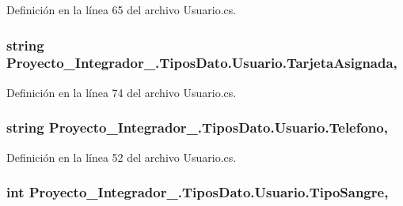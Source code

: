 Definición en la línea 65 del archivo Usuario.\-cs.

\hypertarget{class_proyecto___integrador__3_1_1_tipos_dato_1_1_usuario_a4ecaaf4c0f0b8e78d71fcab8c7da253a}{
\subsubsection[{Tarjeta\-Asignada}]{\setlength{\rightskip}{0pt plus 5cm}string Proyecto\-\_\-\-Integrador\-\_.\-Tipos\-Dato.\-Usuario.\-Tarjeta\-Asignada\hspace{0.3cm}{\ttfamily [get]}, {\ttfamily [set]}}}\label{class_proyecto___integrador__3_1_1_tipos_dato_1_1_usuario_a4ecaaf4c0f0b8e78d71fcab8c7da253a}


Definición en la línea 74 del archivo Usuario.\-cs.

\hypertarget{class_proyecto___integrador__3_1_1_tipos_dato_1_1_usuario_a576131d83803eab74ec85992416f1220}{
\subsubsection[{Telefono}]{\setlength{\rightskip}{0pt plus 5cm}string Proyecto\-\_\-\-Integrador\-\_.\-Tipos\-Dato.\-Usuario.\-Telefono\hspace{0.3cm}{\ttfamily [get]}, {\ttfamily [set]}}}\label{class_proyecto___integrador__3_1_1_tipos_dato_1_1_usuario_a576131d83803eab74ec85992416f1220}


Definición en la línea 52 del archivo Usuario.\-cs.

\hypertarget{class_proyecto___integrador__3_1_1_tipos_dato_1_1_usuario_a03896a1cdb77ff1166088f707b65896c}{
\subsubsection[{Tipo\-Sangre}]{\setlength{\rightskip}{0pt plus 5cm}int Proyecto\-\_\-\-Integrador\-\_.\-Tipos\-Dato.\-Usuario.\-Tipo\-Sangre\hspace{0.3cm}{\ttfamily [get]}, {\ttfamily [set]}}}\label{class_proyecto___integrador__3_1_1_tipos_dato_1_1_usuario_a03896a1cdb77ff1166088f707b65896c}


